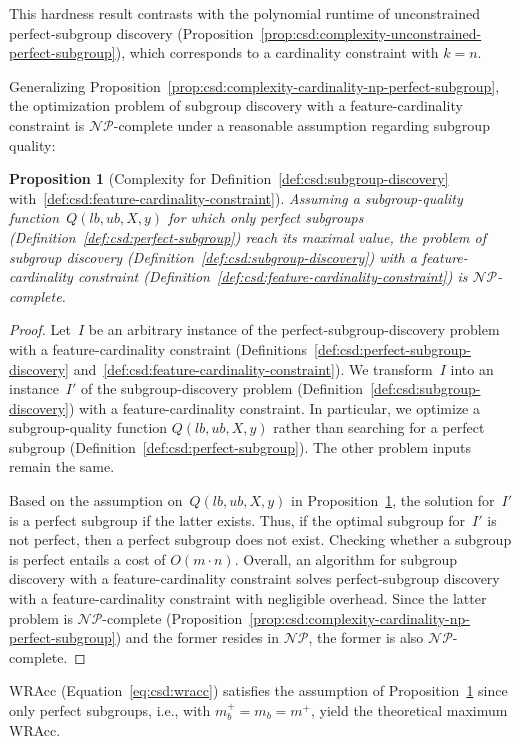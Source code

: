 \documentclass[acmsmall]{acmart} %
\theoremstyle{acmplain}
\newtheorem{proposition}{Proposition}
\theoremstyle{acmdefinition}
\begin{document}
%
This hardness result contrasts with the polynomial runtime of unconstrained perfect-subgroup discovery (Proposition~\ref{prop:csd:complexity-unconstrained-perfect-subgroup}), which corresponds to a cardinality constraint with $k = n$.

Generalizing Proposition~\ref{prop:csd:complexity-cardinality-np-perfect-subgroup}, the optimization problem of subgroup discovery with a feature-cardinality constraint is $\mathcal{NP}$-complete under a reasonable assumption regarding subgroup quality:
%
\begin{proposition}[Complexity for Definition~\ref{def:csd:subgroup-discovery} with~\ref{def:csd:feature-cardinality-constraint}]
	Assuming a subgroup-quality function~$Q(\mathit{lb}, \mathit{ub}, X, y)$ for which only perfect subgroups (Definition~\ref{def:csd:perfect-subgroup}) reach its maximal value,
	the problem of subgroup discovery (Definition~\ref{def:csd:subgroup-discovery}) with a feature-cardinality constraint (Definition~\ref{def:csd:feature-cardinality-constraint}) is $\mathcal{NP}$-complete.
	\label{prop:csd:complexity-cardinality-np}
\end{proposition}
%
\begin{proof}
	Let~$I$ be an arbitrary instance of the perfect-subgroup-discovery problem with a feature-cardinality constraint (Definitions~\ref{def:csd:perfect-subgroup-discovery} and~\ref{def:csd:feature-cardinality-constraint}).
	We transform~$I$ into an instance~$I'$ of the subgroup-discovery problem (Definition~\ref{def:csd:subgroup-discovery}) with a feature-cardinality constraint.
	In particular, we optimize a subgroup-quality function $Q(\mathit{lb}, \mathit{ub}, X, y)$ rather than searching for a perfect subgroup (Definition~\ref{def:csd:perfect-subgroup}).
	The other problem inputs remain the same.
	
	Based on the assumption on~$Q(\mathit{lb}, \mathit{ub}, X, y)$ in Proposition~\ref{prop:csd:complexity-cardinality-np}, the solution for~$I'$ is a perfect subgroup if the latter exists.
	Thus, if the optimal subgroup for~$I'$ is not perfect, then a perfect subgroup does not exist.
	Checking whether a subgroup is perfect entails a cost of $O(m \cdot n)$.
	Overall, an algorithm for subgroup discovery with a feature-cardinality constraint solves perfect-subgroup discovery with a feature-cardinality constraint with negligible overhead.
	Since the latter problem is $\mathcal{NP}$-complete (Proposition~\ref{prop:csd:complexity-cardinality-np-perfect-subgroup}) and the former resides in $\mathcal{NP}$, the former is also $\mathcal{NP}$-complete.
\end{proof}
%
WRAcc (Equation~\ref{eq:csd:wracc}) satisfies the assumption of Proposition~\ref{prop:csd:complexity-cardinality-np} since only perfect subgroups, i.e., with $m_b^+ = m_b = m^+$, yield the theoretical maximum WRAcc.
\end{document}
